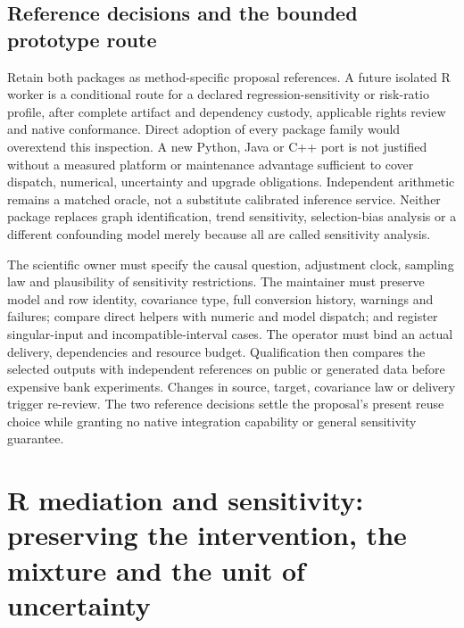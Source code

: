 \subsection{Reference decisions and the bounded prototype route}
\label{exec23:sensitivity-reuse-decision}
Retain both packages as method-specific proposal references. A future isolated
R worker is a conditional route for a declared regression-sensitivity or
risk-ratio profile, after complete artifact and dependency custody, applicable
rights review and native conformance. Direct adoption of every package family
would overextend this inspection. A new Python, Java or C++ port is not
justified without a measured platform or maintenance advantage sufficient to
cover dispatch, numerical, uncertainty and upgrade obligations. Independent
arithmetic remains a matched oracle, not a substitute calibrated inference
service. Neither package replaces graph identification, trend sensitivity,
selection-bias analysis or a different confounding model merely because all
are called sensitivity analysis.
\citep{exec23_sensitivity_sensemakr,exec23_sensitivity_evalue,exec23_sensitivity_reference}

The scientific owner must specify the causal question, adjustment clock,
sampling law and plausibility of sensitivity restrictions. The maintainer
must preserve model and row identity, covariance type, full conversion
history, warnings and failures; compare direct helpers with numeric and model
dispatch; and register singular-input and incompatible-interval cases. The
operator must bind an actual delivery, dependencies and resource budget.
Qualification then compares the selected outputs with independent references
on public or generated data before expensive bank experiments. Changes in
source, target, covariance law or delivery trigger re-review. The two reference
decisions settle the proposal's present reuse choice while granting no native
integration capability or general sensitivity guarantee.


\section[R mediation and sensitivity contracts]{R mediation and sensitivity: preserving the intervention, the mixture and the unit of uncertainty}
\label{sec:exec25-rmed}

